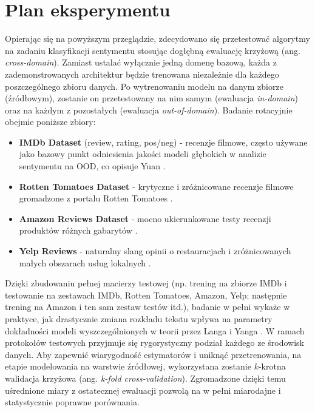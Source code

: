 \documentclass[runningheads]{llncs}
\begin{document}
\section*{Plan eksperymentu}
Opierając się na powyższym przeglądzie, zdecydowano się przetestować algorytmy na zadaniu klasyfikacji sentymentu stosując dogłębną ewaluację krzyżową (ang. \textit{cross-domain}). Zamiast ustalać wyłącznie jedną domenę bazową, każda z zademonstrowanych architektur będzie trenowana niezależnie dla każdego poszczególnego zbioru danych. Po wytrenowaniu modelu na danym zbiorze (źródłowym), zostanie on przetestowany na nim samym (ewaluacja \textit{in-domain}) oraz na każdym z pozostałych (ewaluacja \textit{out-of-domain}). Badanie rotacyjnie obejmie poniższe zbiory:
\begin{itemize}
    \item \textbf{IMDb Dataset} (review, rating, pos/neg) - recenzje filmowe, często używane jako bazowy punkt odniesienia jakości modeli głębokich w analizie sentymentu na OOD, co opisuje Yuan \cite{Yuan2026EmpiricalSO} \cite{imdb_dataset}.
    \item \textbf{Rotten Tomatoes Dataset} - krytyczne i zróżnicowane recenzje filmowe gromadzone z portalu Rotten Tomatoes \cite{rotten_tomatoes}.
    \item \textbf{Amazon Reviews Dataset} - mocno ukierunkowane testy recenzji produktów różnych gabarytów \cite{amazon_reviews}.
    \item \textbf{Yelp Reviews} - naturalny slang opinii o restauracjach i zróżnicowanych małych obszarach usług lokalnych \cite{yelp_dataset}.
\end{itemize}
Dzięki zbudowaniu pełnej macierzy testowej (np. trening na zbiorze IMDb i testowanie na zestawach IMDb, Rotten Tomatoes, Amazon, Yelp; następnie trening na Amazon i ten sam zestaw testów itd.), badanie w pełni wykaże w praktyce, jak drastycznie zmiana rozkładu tekstu wpływa na parametry dokładności modeli wyszczególnionych w teorii przez Langa i Yanga \cite{yang2023outofdistributiongeneralizationtextclassification, lang2023surveyoutofdistributiondetectionnlp}. W ramach protokołów testowych przyjmuje się rygorystyczny podział każdego ze środowisk danych. Aby zapewnić wiarygodność estymatorów i uniknąć przetrenowania, na etapie modelowania na warstwie źródłowej, wykorzystana zostanie $k$-krotna walidacja krzyżowa (ang. \textit{k-fold cross-validation}). Zgromadzone dzięki temu uśrednione miary z ostatecznej ewaluacji pozwolą na w pełni miarodajne i statystycznie poprawne porównania.
\end{document}
